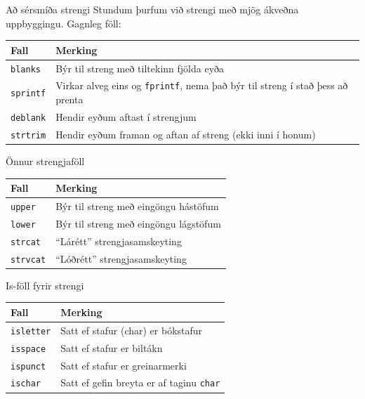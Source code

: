 \documentclass[handout]{beamer}
\begin{document}
\begin{frame}{Að sérsmíða strengi}
\vspace{\baselineskip}
Stundum þurfum við strengi með mjög ákveðna uppbyggingu. Gagnleg föll:
\begin{center}
\begin{tabular}{lp{7cm}}
\toprule
Fall&Merking\\
\midrule
\texttt{blanks}&Býr til streng með tiltekinn fjölda eyða\\
\texttt{sprintf}&Virkar alveg eins og \texttt{fprintf}, nema það býr til streng í stað þess að prenta\\
\texttt{deblank}&Hendir eyðum aftast í strengjum\\
\texttt{strtrim}&Hendir eyðum framan og aftan af streng (ekki inni í honum)\\
\bottomrule
\end{tabular}
\end{center}
\end{frame}

\begin{frame}[fragile]{Önnur strengjaföll}
\begin{center}
\begin{tabular}{ll}
\toprule
Fall&Merking\\
\midrule
\texttt{upper}&Býr til streng með eingöngu hástöfum\\
\texttt{lower}&Býr til streng með eingöngu lágstöfum\\
\texttt{strcat}&``Lárétt'' strengjasamskeyting\\
\texttt{strvcat}&``Lóðrétt'' strengjasamskeyting\\
\bottomrule
\end{tabular}
\end{center}
\end{frame}

\begin{frame}[fragile]{Is-föll fyrir strengi}
\begin{center}
\begin{tabular}{ll}
\toprule
Fall&Merking\\
\midrule
\texttt{isletter}&Satt ef stafur (char) er bókstafur\\
\texttt{isspace}&Satt ef stafur er biltákn\\
\texttt{ispunct}&Satt ef stafur er greinarmerki\\
\texttt{ischar}&Satt ef gefin breyta er af taginu \texttt{char}\\
\bottomrule
\end{tabular}
\end{center}

\end{frame}
\end{document}
